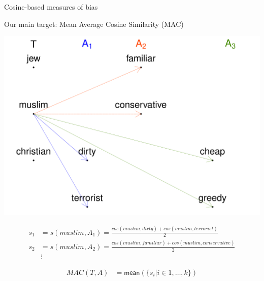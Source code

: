 \documentclass[
  10pt,
  ignorenonframetext,
  x11names, dvipsnames, bibspacing,natbib]{beamer}
\begin{document}
\begin{frame}{Cosine-based measures of bias}
\protect\hypertarget{cosine-based-measures-of-bias-6}{}
\begin{block}{Our main target: Mean Average Cosine Similarity (MAC)}
\protect\hypertarget{our-main-target-mean-average-cosine-similarity-mac}{}
\vspace{1mm}
\footnotesize

\begin{center}\includegraphics[width=0.5\linewidth]{presentationBoston_files/figure-beamer/unnamed-chunk-3-1} \end{center}
\normalsize

\vspace{-4mm}

\footnotesize

\begin{align*}
 s_1 & = s(muslim,A_1) = \frac{cos(muslim,dirty)+cos(muslim,terrorist)}{2}\\
s_2 & = s(muslim,A_2) = \frac{cos(muslim,familiar)+cos(muslim,conservative)}{2}\\
& \vdots \end{align*}

\vspace{-6mm}

\normalsize

\begin{align*}
 MAC(T,A) & = \mathsf{mean}(\{s_i \vert i \in 1, \dots, k\})
\end{align*}
\end{block}
\end{frame}
\end{document}
